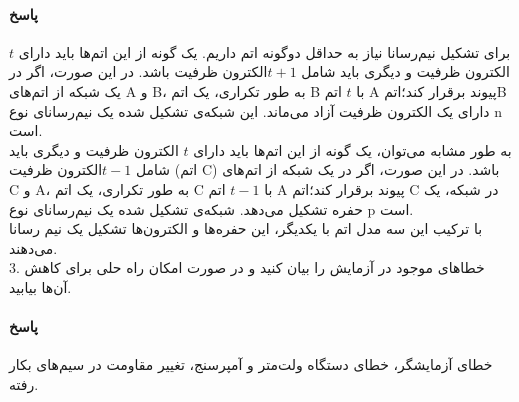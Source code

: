 \documentclass{article}
\begin{document}
\paragraph{پاسخ} برای تشکیل نیم‌رسانا نیاز به حداقل دو‌‌گونه اتم داریم.
یک گونه از این اتم‌ها باید دارای $t$ الکترون ظرفیت  و دیگری باید شامل $t+1 $الکترون ظرفیت باشد. در این صورت، اگر در یک شبکه از اتم‌های A و B، به طور تکراری، یک اتم B با $t$ اتم A پیوند برقرار ‌کند؛اتمB دارای یک الکترون ظرفیت آزاد می‌ماند. این  شبکه‌ی تشکیل شده یک نیم‌رسانای نوع n است.\\
به طور مشابه می‌توان، یک گونه از این اتم‌ها باید دارای $t$ الکترون ظرفیت  و دیگری باید شامل $t-1 $الکترون ظرفیت (اتم C) باشد. در این صورت، اگر در یک شبکه از اتم‌های C و A، به طور تکراری، یک اتم C با $t-1$ اتم A پیوند برقرار ‌کند؛اتم C در شبکه، یک حفره تشکیل می‌دهد‌. شبکه‌ی تشکیل شده یک نیم‌رسانای نوع p است.\\
با ترکیب این سه مدل اتم با یکدیگر، این حفره‌ها و الکترون‌ها تشکیل یک نیم رسانا می‌دهند. \\

3. خطاهای موجود در آزمایش را بیان کنید و در صورت امکان راه حلی برای کاهش آن‌ها بیابید.\\
\paragraph{پاسخ} خطای آزمایشگر، خطای دستگاه ولت‌متر و آمپرسنج، تغییر مقاومت در سیم‌های بکار رفته.

	
	
	
	
	
	
	
	
\end{document}
